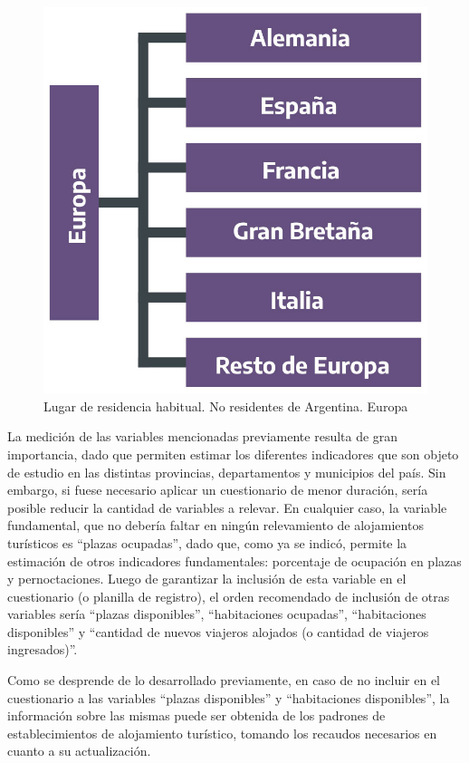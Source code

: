 \documentclass[
]{book}
\begin{document}
\begin{figure}

{\centering \includegraphics[width=0.8\linewidth]{imagenes/figura_2_2_2} 

}

\caption{Lugar de residencia habitual. No residentes de Argentina. Europa}\label{fig:europa}
\end{figure}

La medición de las variables mencionadas previamente resulta de gran importancia, dado que permiten estimar los diferentes indicadores que son objeto de estudio en las distintas provincias, departamentos y municipios del país. Sin embargo, si fuese necesario aplicar un cuestionario de menor duración, sería posible reducir la cantidad de variables a relevar. En cualquier caso, la variable fundamental, que no debería faltar en ningún relevamiento de alojamientos turísticos es ``plazas ocupadas'', dado que, como ya se indicó, permite la estimación de otros indicadores fundamentales: porcentaje de ocupación en plazas y pernoctaciones. Luego de garantizar la inclusión de esta variable en el cuestionario (o planilla de registro), el orden recomendado de inclusión de otras variables sería ``plazas disponibles'', ``habitaciones ocupadas'', ``habitaciones disponibles'' y ``cantidad de nuevos viajeros alojados (o cantidad de viajeros ingresados)''.

Como se desprende de lo desarrollado previamente, en caso de no incluir en el cuestionario a las variables ``plazas disponibles'' y ``habitaciones disponibles'', la información sobre las mismas puede ser obtenida de los padrones de establecimientos de alojamiento turístico, tomando los recaudos necesarios en cuanto a su actualización.
\end{document}
